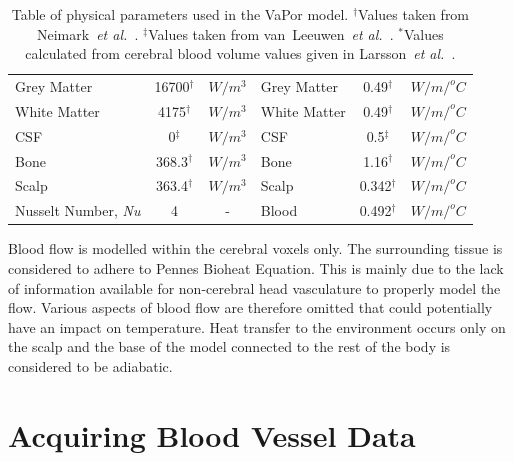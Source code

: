 \documentclass[11pt,english,a4paper,twoside,openright]{report}
\newcommand\Nuss{\mbox{\textit{Nu}}}
\begin{document}
{{{{{{{{\begin{table}
\begin{tabular}{l c c l c c}
		\qquad \qquad \qquad Grey Matter & 16700$^{\dagger}$ & $W/m^{3}$ & \qquad \qquad \qquad Grey Matter & 0.49$^{\dagger}$ & $W/m/^{o}C$ \\
		\qquad \qquad \qquad White Matter & 4175$^{\dagger}$ & $W/m^{3}$ & \qquad \qquad \qquad White Matter & 0.49$^{\dagger}$ & $W/m/^{o}C$ \\ 
		\qquad \qquad \qquad CSF & 0$^{\ddagger}$ & $W/m^{3}$ & \qquad \qquad \qquad CSF & 0.5$^{\ddagger}$ & $W/m/^{o}C$ \\ 
		\qquad \qquad \qquad Bone & 368.3$^{\dagger}$ & $W/m^{3}$ & \qquad \qquad \qquad Bone & 1.16$^{\dagger}$ & $W/m/^{o}C$ \\ 
		\qquad \qquad \qquad Scalp & 363.4$^{\dagger}$ & $W/m^{3}$ & \qquad \qquad \qquad Scalp & 0.342$^{\dagger}$ & $W/m/^{o}C$ \\ 
		Nusselt Number, \Nuss & 4 & - & \qquad Blood & 0.492$^{\dagger}$ & $W/m/^{o}C$ \\ \bottomrule
	\end{tabular}
	
	\caption[Physical parameters used in the VaPor model]{Table of physical parameters used in the VaPor model. $^{\dagger}$Values taken from Neimark~\textit{et al.\ }\cite{neimark2008brain}. $^{\ddagger}$Values taken from van~Leeuwen~\textit{et al.\ }\cite{van2000numerical}. $^{*}$Values calculated from cerebral blood volume values given in Larsson~\textit{et al.\ }\cite{larsson2009measurement}.}
	\label{tab:physicalparams2}
\end{table}

Blood flow is modelled within the cerebral voxels only. The surrounding tissue is considered to adhere to Pennes Bioheat Equation. This is mainly due to the lack of information available for non-cerebral head vasculature to properly model the flow. Various aspects of blood flow are therefore omitted that could potentially have an impact on temperature. Heat transfer to the environment occurs only on the scalp and the base of the model connected to the rest of the body is considered to be adiabatic.

\section[Acquiring Blood Vessel Data]{{\Large A}cquiring {\Large B}lood {\Large V}essel {\Large D}ata}
\label{Sec:3AcquiringBloodVesselData}

}}}}}}}}
\end{document}

